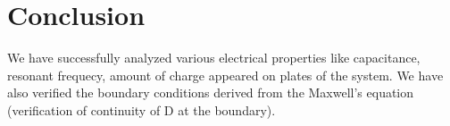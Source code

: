 \documentclass[11pt]{article}
\begin{document}
    \hypertarget{conclusion}{%
\section{Conclusion}\label{conclusion}}

We have successfully analyzed various electrical properties like
capacitance, resonant frequecy, amount of charge appeared on plates of
the system. We have also verified the boundary conditions derived from
the Maxwell's equation (verification of continuity of D at the
boundary).


    
    
    
\end{document}
